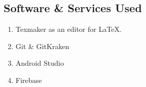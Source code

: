 \subsection{Software \& Services Used}
\begin{enumerate}
\item Texmaker as an editor for \LaTeX.
\item Git \& GitKraken
\item Android Studio
\item Firebase
\end{enumerate}